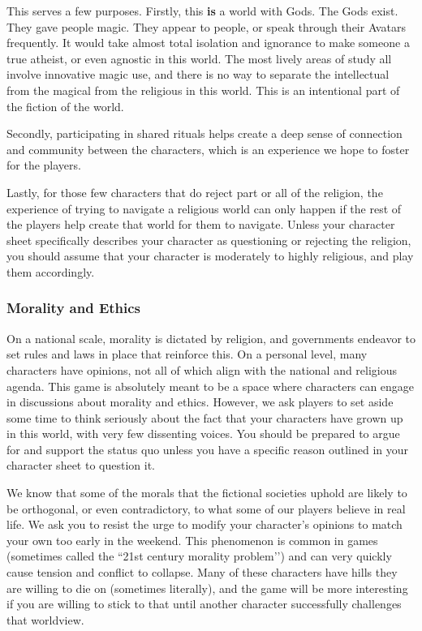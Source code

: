 \documentclass[sheet]{GL2020}
\begin{document}
This serves a few purposes. Firstly, this \textbf{is} a world with Gods. The Gods exist. They gave people magic. They appear to people, or speak through their Avatars frequently. It would take almost total isolation and ignorance to make someone a true atheist, or even agnostic in this world. The most lively areas of study all involve innovative magic use, and there is no way to separate the intellectual from the magical from the religious in this world. This is an intentional part of the fiction of the world. 

Secondly, participating in shared rituals helps create a deep sense of connection and community between the characters, which is an experience we hope to foster for the players. 

Lastly, for those few characters that do reject part or all of the religion, the experience of trying to navigate a religious world can only happen if the rest of the players help create that world for them to navigate. Unless your character sheet specifically describes your character as questioning or rejecting the religion, you should assume that your character is moderately to highly religious, and play them accordingly. 

\subsubsection{Morality and Ethics}
On a national scale, morality is dictated by religion, and governments endeavor to set rules and laws in place that reinforce this. On a personal level, many characters have opinions, not all of which align with the national and religious agenda. This game is absolutely meant to be a space where characters can engage in discussions about morality and ethics. However, we ask players to set aside some time to think seriously about the fact that your characters have grown up in this world, with very few dissenting voices. You should be prepared to argue for and support the status quo unless you have a specific reason outlined in your character sheet to question it.

We know that some of the morals that the fictional societies uphold are likely to be orthogonal, or even contradictory, to what some of our players believe in real life. We ask you to resist the urge to modify your character’s opinions to match your own too early in the weekend. This phenomenon is common in games (sometimes called the ``21st century morality problem’’) and can very quickly cause tension and conflict to collapse. Many of these characters have hills they are willing to die on (sometimes literally), and the game will be more interesting if you are willing to stick to that until another character successfully challenges that worldview. 
\end{document}
